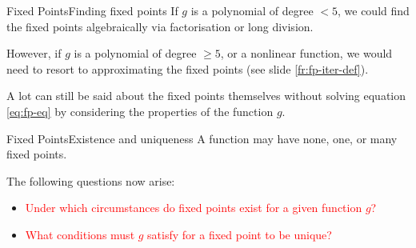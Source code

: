 \documentclass[12pt,aspectratio=169]{beamer}
\begin{document}
\begin{frame}{Fixed Points}{Finding fixed points}
  If $g$ is a polynomial of degree $< 5$, we could find the fixed
  points algebraically via factorisation or long division.

  However, if $g$ is a polynomial of degree $\geq 5$, or a nonlinear function,
  we would need to resort to approximating the fixed points (see slide
  \ref{fr:fp-iter-def}).

  A lot can still be said about the fixed points themselves without solving
  equation \eqref{eq:fp-eq} by considering the properties of the function $g$.
\end{frame}


\begin{frame}{Fixed Points}{Existence and uniqueness}
  A function may have none, one, or many fixed points.

  The following questions now arise: 
  \begin{itemize}
    \item \textcolor{red}{%
      Under which circumstances do fixed points exist for a given
      function $g$?
      }
    \item \textcolor{red}{%
      What conditions must $g$ satisfy for a fixed point to be unique?
      }
  \end{itemize}
\end{frame}
\end{document}
